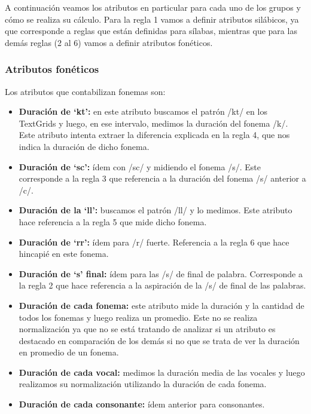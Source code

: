 A continuación veamos los atributos en particular para cada uno de los grupos y cómo se realiza su cálculo. Para la regla 1 vamos a definir atributos silábicos, ya que corresponde a reglas que están definidas para sílabas, mientras que para las demás reglas (2 al 6) vamos a definir atributos fonéticos.

\subsubsection{Atributos fonéticos}

Los atributos que contabilizan fonemas son:

\begin{itemize}
    \item \textbf{Duración de `kt’:} en este atributo buscamos el patrón /kt/ en los TextGrids y luego, en ese intervalo, medimos la duración del fonema /k/. Este atributo intenta extraer la diferencia explicada en la regla 4, que nos indica la duración de dicho fonema.
    \item \textbf{Duración de `sc’:} ídem con /sc/ y midiendo el fonema /s/. Este corresponde a la regla 3 que referencia a la duración del fonema /s/ anterior a /c/.  
    \item \textbf{Duración de la `ll’:} buscamos el patrón /ll/ y lo medimos. Este atributo hace referencia a la regla 5 que mide dicho fonema.
    \item \textbf{Duración de `rr’:} ídem para /r/ fuerte. Referencia a la regla 6 que hace hincapié en este fonema.
    \item \textbf{Duración de `s’ final:} ídem para las /s/ de final de palabra. Corresponde a la regla 2 que hace referencia a la aspiración de la /s/ de final de las palabras.  
    \item \textbf{Duración de cada fonema:} este atributo mide la duración y la cantidad de todos los fonemas y luego realiza un promedio. Este no se realiza normalización ya que no se está tratando de analizar si un atributo es destacado en comparación de los demás si no que se trata de ver la duración en promedio de un fonema.
    \item \textbf{Duración de cada vocal:} medimos la duración media de las vocales y luego realizamos su normalización utilizando la duración de cada fonema.
    \item \textbf{Duración de cada consonante:} ídem anterior para consonantes. 
\end{itemize}


